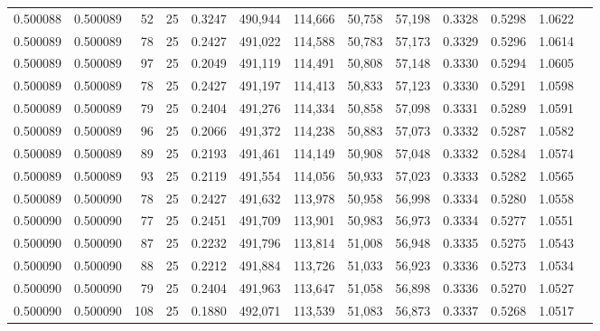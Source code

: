 \begin{tabular}{rrrrrrrrrrrrr}
0.500088 & 0.500089 &    52 &  25 &                                     0.3247 & 490,944 & 114,666 &  50,758 &  57,198 & 0.3328 & 0.5298 & 1.0622 \\
0.500089 & 0.500089 &    78 &  25 &                                     0.2427 & 491,022 & 114,588 &  50,783 &  57,173 & 0.3329 & 0.5296 & 1.0614 \\
0.500089 & 0.500089 &    97 &  25 &                                     0.2049 & 491,119 & 114,491 &  50,808 &  57,148 & 0.3330 & 0.5294 & 1.0605 \\
0.500089 & 0.500089 &    78 &  25 &                                     0.2427 & 491,197 & 114,413 &  50,833 &  57,123 & 0.3330 & 0.5291 & 1.0598 \\
0.500089 & 0.500089 &    79 &  25 &                                     0.2404 & 491,276 & 114,334 &  50,858 &  57,098 & 0.3331 & 0.5289 & 1.0591 \\
0.500089 & 0.500089 &    96 &  25 &                                     0.2066 & 491,372 & 114,238 &  50,883 &  57,073 & 0.3332 & 0.5287 & 1.0582 \\
0.500089 & 0.500089 &    89 &  25 &                                     0.2193 & 491,461 & 114,149 &  50,908 &  57,048 & 0.3332 & 0.5284 & 1.0574 \\
0.500089 & 0.500089 &    93 &  25 &                                     0.2119 & 491,554 & 114,056 &  50,933 &  57,023 & 0.3333 & 0.5282 & 1.0565 \\
0.500089 & 0.500090 &    78 &  25 &                                     0.2427 & 491,632 & 113,978 &  50,958 &  56,998 & 0.3334 & 0.5280 & 1.0558 \\
0.500090 & 0.500090 &    77 &  25 &                                     0.2451 & 491,709 & 113,901 &  50,983 &  56,973 & 0.3334 & 0.5277 & 1.0551 \\
0.500090 & 0.500090 &    87 &  25 &                                     0.2232 & 491,796 & 113,814 &  51,008 &  56,948 & 0.3335 & 0.5275 & 1.0543 \\
0.500090 & 0.500090 &    88 &  25 &                                     0.2212 & 491,884 & 113,726 &  51,033 &  56,923 & 0.3336 & 0.5273 & 1.0534 \\
0.500090 & 0.500090 &    79 &  25 &                                     0.2404 & 491,963 & 113,647 &  51,058 &  56,898 & 0.3336 & 0.5270 & 1.0527 \\
0.500090 & 0.500090 &   108 &  25 &                                     0.1880 & 492,071 & 113,539 &  51,083 &  56,873 & 0.3337 & 0.5268 & 1.0517 \\

\end{tabular}
